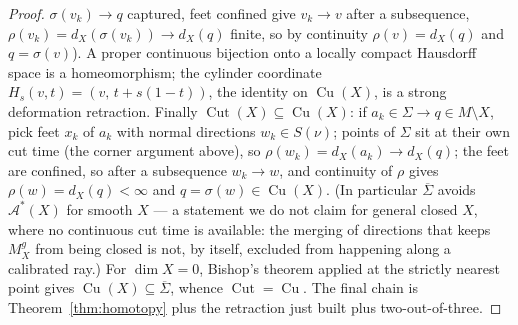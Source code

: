 \documentclass[11pt]{article}
\theoremstyle{remark}
\newcommand{\X}{X}
\newcommand{\Mg}{M^{g}_{\X}}
\newcommand{\dX}{d_{\X}}
\newcommand{\Cut}{\operatorname{Cut}}
\newcommand{\Aub}{\mathcal{A}^{\ast}}
\newcommand{\Cu}{\operatorname{Cu}}
\begin{document}
\begin{proof}
$\sigma(v_{k})\to q$ captured, feet confined give $v_{k}\to v$
after a subsequence, $\rho(v_{k})=\dX(\sigma(v_{k}))\to\dX(q)$
finite, so by continuity $\rho(v)=\dX(q)$ and $q=\sigma(v)$). A
proper continuous bijection onto a locally compact Hausdorff space
is a homeomorphism; the cylinder coordinate
$H_{s}(v,t)=(v,\,t+s(1-t))$, the identity on $\Cu(\X)$, is a
strong deformation retraction. Finally
$\Cut(\X)\subseteq\Cu(\X)$: if $a_{k}\in\Sigma\to q\in
M\setminus\X$, pick feet $x_{k}$ of $a_{k}$ with normal directions
$w_{k}\in S(\nu)$; points of $\Sigma$ sit at their own cut time
(the corner argument above), so
$\rho(w_{k})=\dX(a_{k})\to\dX(q)$; the feet are confined, so after
a subsequence $w_{k}\to w$, and continuity of $\rho$ gives
$\rho(w)=\dX(q)<\infty$ and $q=\sigma(w)\in\Cu(\X)$. (In
particular $\overline{\Sigma}$ avoids $\Aub(\X)$ for smooth $\X$
--- a statement we do not claim for general closed $\X$, where no
continuous cut time is available: the merging of directions that
keeps $\Mg$ from being closed is not, by itself, excluded from
happening along a calibrated ray.) For
$\dim\X=0$, Bishop's theorem \cite{Bis} applied at the strictly
nearest point gives $\Cu(\X)\subseteq\overline{\Sigma}$, whence
$\Cut=\Cu$. The final chain is Theorem~\ref{thm:homotopy} plus the
retraction just built plus two-out-of-three.
\end{proof}
\end{document}
